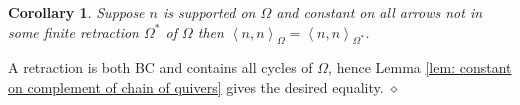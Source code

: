 \documentclass{article}
\newcommand{\bracket}[1]{\left \langle #1 \right\rangle}
\newtheorem{lemma}{Lemma}[section]
\newtheorem{remark}{Remark}[section]
\newtheorem{corollary}{Corollary}[section]
\newenvironment{proof}{\vspace*{2ex}\noindent {\em Proof:}
}{\hfill $\diamond$ \\[2ex]}
\begin{document}
\begin{corollary}\label{cor: constant on complement of retraction}
Suppose $n$ is supported on $\Omega$ and constant on all arrows not in some finite retraction $\Omega^*$ of $\Omega$ then $\bracket{n,  n}_\Omega = \bracket{n , n}_{\Omega^*}$.
\end{corollary}

\begin{proof}
A retraction is both BC and contains all cycles of $\Omega$, hence Lemma \ref{lem: constant on complement of chain of quivers} gives the desired equality. 
\end{proof}





\end{document}

